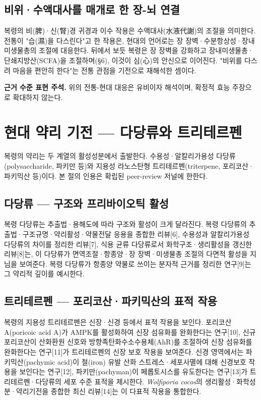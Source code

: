 \documentclass[12pt,oneside]{book}
\newenvironment{authnote}
  {\par\smallskip\begingroup\leftskip=6mm\rightskip=3mm\small\color{muted}\noindent\ignorespaces}
  {\par\endgroup\smallskip}
\begin{document}
\subsection{비위·수액대사를 매개로 한 장-뇌 연결}

복령의 비(脾)·신(腎)경 귀경과 이수 작용은 수액대사(水液代謝)의 조절을 의미한다. 전통이 "습(濕)을 다스린다"고 한 작용은, 현대의 언어로는 장 장벽·수분항상성·장내미생물총의 조절에 대응한다. 뒤에서 보듯 복령은 장 장벽을 강화하고 장내미생물총·단쇄지방산(SCFA)을 조절하며(§6), 이것이 심(心)의 안신으로 이어진다. "비위를 다스려 마음을 편안히 한다"는 전통 관점을 기전으로 재해석한 셈이다.

\begin{authnote}\textbf{근거 수준 표현 주석.} 위의 전통-현대 대응은 유비이자 해석이며, 확정적 효능 주장으로 확대하지 않는다.\end{authnote}

\section{현대 약리 기전 — 다당류와 트리테르펜}

복령의 약리는 두 계열의 활성성분에서 출발한다. 수용성·알칼리가용성 다당류(polysaccharide, 파키만 등)와 지용성 라노스탄형 트리테르펜(triterpene, 포리코산·파키믹산 등)이다. 본 절의 인용은 확립된 peer-review 저널에 한한다.

\subsection{다당류 — 구조와 프리바이오틱 활성}

복령 다당류는 추출법·용해도에 따라 구조와 활성이 크게 달라진다. 복령 다당류의 추출법·구조규명·약리활성·약물전달 응용을 종합한 리뷰[6], 수용성과 알칼리가용성 다당류의 차이를 정리한 리뷰[7], 식용 균류 다당류로서 화학구조·생리활성을 갱신한 리뷰[8]는, 이 다당류가 면역조절·항종양·장 장벽·미생물총 조절의 다면적 활성을 지님을 보여준다. 복령 다당류가 항종양 약물로 쓰이는 분자적 근거를 정리한 연구[9]는 그 약리적 깊이를 예시한다.

\subsection{트리테르펜 — 포리코산·파키믹산의 표적 작용}

복령의 지용성 트리테르펜은 신장·신경 등에서 표적 작용을 보인다. 포리코산 A(poricoic acid A)가 AMPK를 활성화하여 신장 섬유화를 완화한다는 연구[10], 신규 포리코산이 산화환원 신호와 방향족탄화수소수용체(AhR)를 조절하여 신장 섬유화를 완화한다는 연구[11]가 트리테르펜의 신장 보호 작용을 보여준다. 신경 영역에서는 파키믹산(pachymic acid)이 철(iron) 유발 산화 스트레스·세포사멸에 대해 신경보호 작용을 보인다는 연구[12], 파키만(pachyman)이 페롭토시스를 유도한다는 연구[13]가 트리테르펜·다당류의 세포 수준 표적을 제시한다. \textit{Wolfiporia cocos}의 생리활성·화학성분·약리기전을 종합한 최신 리뷰[14]는 이 다표적 작용을 통합한다.
\end{document}
